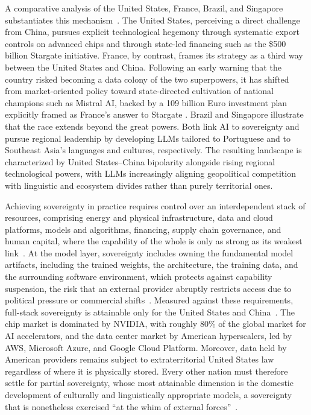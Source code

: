 \documentclass[
english,                 %
bibtex,                  %
]{kththesis}
\numberwithin{listing}{chapter}
\begin{document}
A comparative analysis of the United States, France, Brazil, and Singapore substantiates this mechanism~\cite{wang_generative_2025}. The United States, perceiving a direct challenge from China, pursues explicit technological hegemony through systematic export controls on advanced chips and through state-led financing such as the \$500 billion Stargate initiative. France, by contrast, frames its strategy as a third way between the United States and China. Following an early warning that the country risked becoming a data colony of the two superpowers, it has shifted from market-oriented policy toward state-directed cultivation of national champions such as Mistral \gls{AI}, backed by a 109 billion Euro investment plan explicitly framed as France's answer to Stargate \cite{sun_frances_2026}. Brazil and Singapore illustrate that the race extends beyond the great powers. Both link \gls{AI} to sovereignty and pursue regional leadership by developing \glspl{LLM} tailored to Portuguese and to Southeast Asia's languages and cultures, respectively. The resulting landscape is characterized by United States--China bipolarity alongside rising regional technological powers, with \glspl{LLM} increasingly aligning geopolitical competition with linguistic and ecosystem divides rather than purely territorial ones.

Achieving sovereignty in practice requires control over an interdependent stack of resources, comprising energy and physical infrastructure, data and cloud platforms, models and algorithms, financing, supply chain governance, and human capital, where the capability of the whole is only as strong as its weakest link~\cite{andres_perez_strategic_2026}. At the model layer, sovereignty includes owning the fundamental model artifacts, including the trained weights, the architecture, the training data, and the surrounding software environment, which protects against capability suspension, the risk that an external provider abruptly restricts access due to political pressure or commercial shifts~\cite{andres_perez_strategic_2026}. Measured against these requirements, full-stack sovereignty is attainable only for the United States and China~\cite{dale_sovereign_2025}. The chip market is dominated by NVIDIA, with roughly 80\% of the global market for \gls{AI} accelerators, and the data center market by American hyperscalers, led by \gls{AWS}, Microsoft Azure, and Google Cloud Platform. Moreover, data held by American providers remains subject to extraterritorial United States law regardless of where it is physically stored. Every other nation must therefore settle for partial sovereignty, whose most attainable dimension is the domestic development of culturally and linguistically appropriate models, a sovereignty that is nonetheless exercised ``at the whim of external forces''~\cite{dale_sovereign_2025}.
\end{document}
